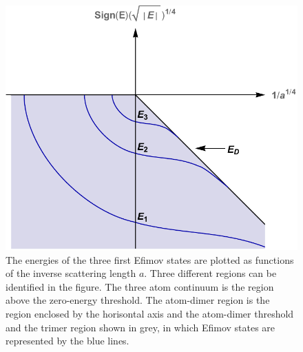 \begin{figure}
	\centering
	\includegraphics[width=0.75\linewidth]{efimov}
	\caption{The energies of the three first Efimov states are plotted as  functions of the inverse scattering length $a$. Three different regions can be identified in the figure. The three atom continuum is the region above the zero-energy threshold. The atom-dimer region is the region enclosed by the horisontal axis and the atom-dimer threshold and the trimer region shown in grey, in which Efimov states are represented by the blue lines.\cite{Kajsa_my}}\label{fig:efimov}
\end{figure} 
